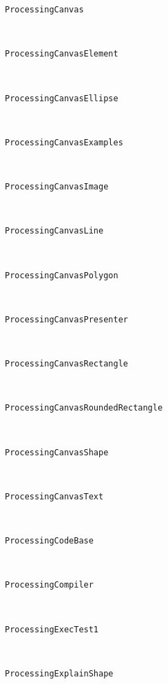 \begin{description}
\item[\texttt{ProcessingCanvas}] \hfill \\
	
\item[\texttt{ProcessingCanvasElement}] \hfill \\
	
\item[\texttt{ProcessingCanvasEllipse}] \hfill \\
	
\item[\texttt{ProcessingCanvasExamples}] \hfill \\
	
\item[\texttt{ProcessingCanvasImage}] \hfill \\
	
\item[\texttt{ProcessingCanvasLine}] \hfill \\
	
\item[\texttt{ProcessingCanvasPolygon}] \hfill \\
	
\item[\texttt{ProcessingCanvasPresenter}] \hfill \\
	
\item[\texttt{ProcessingCanvasRectangle}] \hfill \\
	
\item[\texttt{ProcessingCanvasRoundedRectangle}] \hfill \\
	
\item[\texttt{ProcessingCanvasShape}] \hfill \\
	
\item[\texttt{ProcessingCanvasText}] \hfill \\
	
\item[\texttt{ProcessingCodeBase}] \hfill \\
	
\item[\texttt{ProcessingCompiler}] \hfill \\
	
\item[\texttt{ProcessingExecTest1}] \hfill \\
	
\item[\texttt{ProcessingExplainShape}] \hfill \\
	

\end{description}
